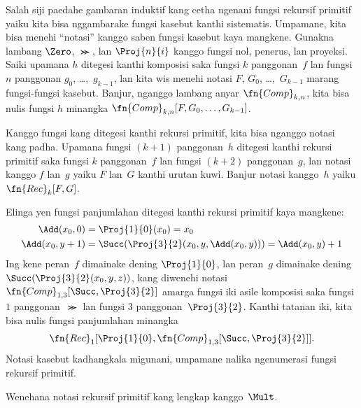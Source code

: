 \documentclass[../../../include/open-logic-section]{subfiles}
\begin{document}

Salah siji paedahe gambaran induktif kang cetha ngenani fungsi
rekursif primitif yaiku kita bisa nggambarake fungsi kasebut
kanthi sistematis. Umpamane, kita bisa menehi “notasi” kanggo
saben fungsi kasebut kaya mangkene. Gunakna lambang $\Zero$,
$\Succ$, lan $\Proj{n}{i}$ kanggo fungsi nol, penerus, lan
proyeksi. Saiki upamana $h$ ditegesi kanthi komposisi saka
fungsi $k$ panggonan~$f$ lan fungsi $n$ panggonan $g_0$,
\dots,~$g_{k-1}$, lan kita wis menehi notasi $F$, $G_0$,
\dots,~$G_{k-1}$ marang fungsi-fungsi kasebut. Banjur,
nganggo lambang anyar $\fn{Comp}_{k,n}$, kita bisa nulis
fungsi $h$ minangka $\fn{Comp}_{k,n}[F,G_0,\dots,G_{k-1}]$.

Kanggo fungsi kang ditegesi kanthi rekursi primitif,
kita bisa nganggo notasi kang padha. Upamana fungsi
$(k+1)$ panggonan~$h$ ditegesi kanthi rekursi primitif
saka fungsi $k$ panggonan~$f$ lan fungsi $(k+2)$ panggonan~$g$,
lan notasi kanggo $f$ lan~$g$ yaiku $F$ lan~$G$
kanthi urutan kuwi. Banjur notasi kanggo~$h$ yaiku
$\fn{Rec}_k[F,G]$.

Elinga yen fungsi panjumlahan ditegesi kanthi rekursi primitif
kaya mangkene:
\begin{align*}
  \Add(x_0, 0) & = \Proj{1}{0}(x_0) = x_0\\
  \Add(x_0, y+1) & = \Succ(\Proj{3}{2}(x_0, y, \Add(x_0, y))) = \Add(x_0, y) +1
\end{align*}
Ing kene peran~$f$ dimainake dening $\Proj{1}{0}$, lan peran~$g$
dimainake dening $\Succ(\Proj{3}{2}(x_0, y, z))$, kang diwenehi
notasi $\fn{Comp}_{1,3}[\Succ,\Proj{3}{2}]$ amarga fungsi iki
asile komposisi saka fungsi $1$ panggonan~$\Succ$
lan fungsi $3$ panggonan~$\Proj{3}{2}$. Kanthi tatanan iki,
kita bisa nulis fungsi panjumlahan minangka
\[
\fn{Rec}_1[\Proj{1}{0},\fn{Comp}_{1,3}[\Succ,\Proj{3}{2}]].
\]
Notasi kasebut kadhangkala migunani, umpamane nalika
ngenumerasi fungsi rekursif primitif.

\begin{prob}
  Wenehana notasi rekursif primitif kang lengkap kanggo~$\Mult$.
\end{prob}
\end{document}
